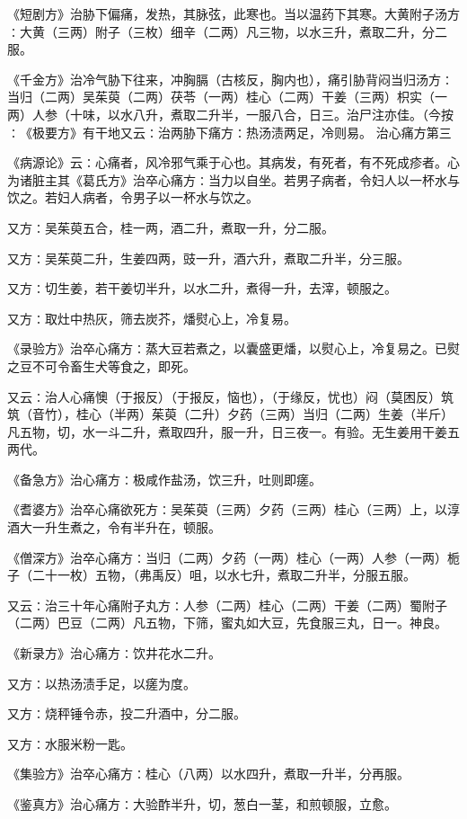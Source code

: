 \documentclass[a4paper,12pt,UTF8,twoside]{ctexbook}
\begin{document}
《短剧方》治胁下偏痛，发热，其脉弦，此寒也。当以温药下其寒。大黄附子汤方∶大黄（三两）附子（三枚）细辛（二两）凡三物，以水三升，煮取二升，分二服。

《千金方》治冷气胁下往来，冲胸膈（古核反，胸内也），痛引胁背闷当归汤方∶当归（二两）吴茱萸（二两）茯苓（一两）桂心（二两）干姜（三两）枳实（一两）人参（十味，以水八升，煮取二升半，一服八合，日三。治尸注亦佳。（今按∶《极要方》有干地又云∶治两胁下痛方∶热汤渍两足，冷则易。
治心痛方第三

《病源论》云∶心痛者，风冷邪气乘于心也。其病发，有死者，有不死成疹者。心为诸脏主其《葛氏方》治卒心痛方∶当力以自坐。若男子病者，令妇人以一杯水与饮之。若妇人病者，令男子以一杯水与饮之。

又方∶吴茱萸五合，桂一两，酒二升，煮取一升，分二服。

又方∶吴茱萸二升，生姜四两，豉一升，酒六升，煮取二升半，分三服。

又方∶切生姜，若干姜切半升，以水二升，煮得一升，去滓，顿服之。

又方∶取灶中热灰，筛去炭芥，燔熨心上，冷复易。

《录验方》治卒心痛方∶蒸大豆若煮之，以囊盛更燔，以熨心上，冷复易之。已熨之豆不可令畜生犬等食之，即死。

又云∶治人心痛懊（于报反）（于报反，恼也），（于缘反，忧也）闷（莫困反）筑筑（音竹），桂心（半两）茱萸（二升）夕药（三两）当归（二两）生姜（半斤）凡五物，切，水一斗二升，煮取四升，服一升，日三夜一。有验。无生姜用干姜五两代。

《备急方》治心痛方∶极咸作盐汤，饮三升，吐则即瘥。

《耆婆方》治卒心痛欲死方∶吴茱萸（三两）夕药（三两）桂心（三两）上，以淳酒大一升生煮之，令有半升在，顿服。

《僧深方》治卒心痛方∶当归（二两）夕药（一两）桂心（一两）人参（一两）栀子（二十一枚）五物，（弗禹反）咀，以水七升，煮取二升半，分服五服。

又云∶治三十年心痛附子丸方∶人参（二两）桂心（二两）干姜（二两）蜀附子（二两）巴豆（二两）凡五物，下筛，蜜丸如大豆，先食服三丸，日一。神良。

《新录方》治心痛方∶饮井花水二升。

又方∶以热汤渍手足，以瘥为度。

又方∶烧秤锤令赤，投二升酒中，分二服。

又方∶水服米粉一匙。

《集验方》治卒心痛方∶桂心（八两）以水四升，煮取一升半，分再服。

《鉴真方》治心痛方∶大验酢半升，切，葱白一茎，和煎顿服，立愈。
\end{document}
